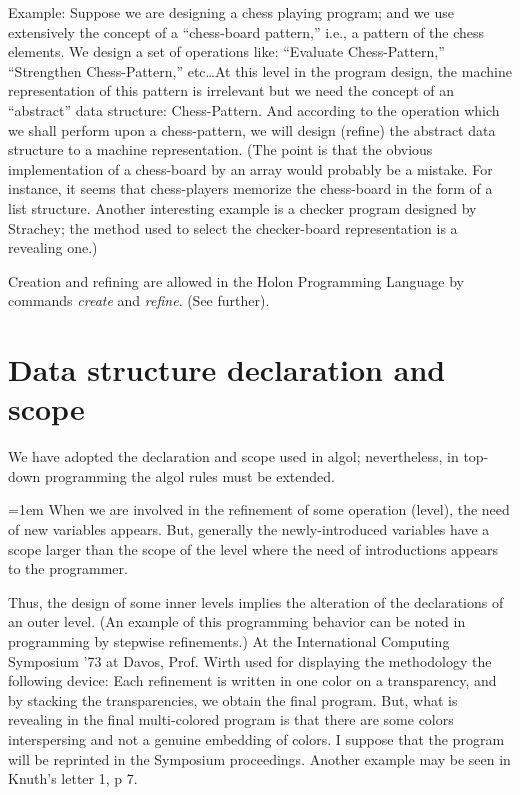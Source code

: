 \documentclass[openany,nobib]{tufte-book}
\begin{document}
Example: Suppose we are designing a chess playing program; and we use
extensively the concept of a ``chess-board pattern,'' i.e., a pattern of the
chess elements. We design a set of operations like: ``Evaluate Chess-Pattern,''
``Strengthen Chess-Pattern,'' etc\dots At this level in the program design, the
machine representation of this pattern is irrelevant but we need the concept of
an ``abstract'' data structure: Chess-Pattern. And according to the operation
which we shall perform upon a chess-pattern, we will design (refine) the
abstract data structure to a machine representation.
(The point is that the obvious implementation of a chess-board by an array
would probably be a mistake. For instance, it seems that chess-players memorize
the chess-board in the form of a list structure.\autocite{simon1969sciences}
Another interesting example is a checker program designed by Strachey; the
method used to select the checker-board representation is a revealing
one.\autocite{strachey1966system})

Creation and refining are allowed in the Holon Programming Language by commands
{\sl create} and {\sl refine}. (See further).

\section{Data structure declaration and scope}
\label{sec:data-structure}

We have adopted the declaration and scope used in {\sc algol}; nevertheless, in
top-down programming the {\sc algol} rules must be extended.

{\emergencystretch=1em When we are involved in the refinement of some operation
(level), the need of
new variables appears. But, generally the newly-introduced variables have a
scope larger than the scope of the level where the need of introductions
appears to the programmer.\par}

Thus, the design of some inner levels implies the alteration of the
declarations of an outer level. (An example of this programming behavior can be
noted in programming by stepwise refinements.) At the International Computing
Symposium '73 at Davos, Prof. Wirth used for displaying the methodology the
following device: Each refinement is written in one color on a transparency,
and by stacking the transparencies, we obtain the final program. But, what is
revealing in the final multi-colored program is that there are some colors
interspersing and not a genuine embedding of colors. I suppose that the program
will be reprinted in the Symposium proceedings. Another example may be seen in
Knuth's letter 1, p 7.\autocite{knuth1973review}
\end{document}

